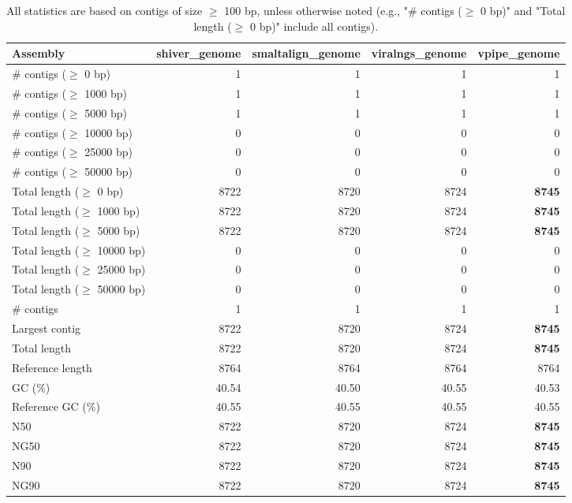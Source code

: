 \documentclass[12pt,a4paper]{article}
\begin{document}
\begin{table}[ht]
\begin{center}
\caption{All statistics are based on contigs of size $\geq$ 100 bp, unless otherwise noted (e.g., "\# contigs ($\geq$ 0 bp)" and "Total length ($\geq$ 0 bp)" include all contigs).}
\begin{tabular}{|l*{4}{|r}|}
\hline
Assembly & shiver\_genome & smaltalign\_genome & viralngs\_genome & vpipe\_genome \\ \hline
\# contigs ($\geq$ 0 bp) & 1 & 1 & 1 & 1 \\ \hline
\# contigs ($\geq$ 1000 bp) & 1 & 1 & 1 & 1 \\ \hline
\# contigs ($\geq$ 5000 bp) & 1 & 1 & 1 & 1 \\ \hline
\# contigs ($\geq$ 10000 bp) & 0 & 0 & 0 & 0 \\ \hline
\# contigs ($\geq$ 25000 bp) & 0 & 0 & 0 & 0 \\ \hline
\# contigs ($\geq$ 50000 bp) & 0 & 0 & 0 & 0 \\ \hline
Total length ($\geq$ 0 bp) & 8722 & 8720 & 8724 & {\bf 8745} \\ \hline
Total length ($\geq$ 1000 bp) & 8722 & 8720 & 8724 & {\bf 8745} \\ \hline
Total length ($\geq$ 5000 bp) & 8722 & 8720 & 8724 & {\bf 8745} \\ \hline
Total length ($\geq$ 10000 bp) & 0 & 0 & 0 & 0 \\ \hline
Total length ($\geq$ 25000 bp) & 0 & 0 & 0 & 0 \\ \hline
Total length ($\geq$ 50000 bp) & 0 & 0 & 0 & 0 \\ \hline
\# contigs & 1 & 1 & 1 & 1 \\ \hline
Largest contig & 8722 & 8720 & 8724 & {\bf 8745} \\ \hline
Total length & 8722 & 8720 & 8724 & {\bf 8745} \\ \hline
Reference length & 8764 & 8764 & 8764 & 8764 \\ \hline
GC (\%) & 40.54 & 40.50 & 40.55 & 40.53 \\ \hline
Reference GC (\%) & 40.55 & 40.55 & 40.55 & 40.55 \\ \hline
N50 & 8722 & 8720 & 8724 & {\bf 8745} \\ \hline
NG50 & 8722 & 8720 & 8724 & {\bf 8745} \\ \hline
N90 & 8722 & 8720 & 8724 & {\bf 8745} \\ \hline
NG90 & 8722 & 8720 & 8724 & {\bf 8745} \\ \hline

\end{tabular}
\end{center}
\end{table}
\end{document}
